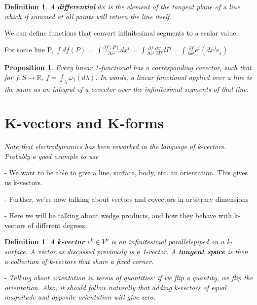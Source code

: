 \documentclass{book}
\newtheorem{defn}[equation]{Definition}
\newtheorem{prop}[equation]{Proposition}
\begin{document}
\begin{defn}
	A \textbf{differential} $dx$ is the element of the tangent plane of a line which if summed at all points will return the line itself. 
\end{defn}

We can define functions that convert infinitesimal segments to a scalar value. 

For some line P, $\int df(P)$ = $\int \frac{\partial f(P)}{{\partial x^i}} dx^i$ = $\int \frac{\partial f}{\partial x^i}\frac{\partial x^i}{\partial P}dP$ = $\int \frac{{\partial f}}{{\partial x^i}} e^i (dx^j e_j)$






\begin{prop}
	Every linear 1-functional has a corresponding covector, such that for $f : S \to \mathbb{R}$, $f = \int_{\lambda} \omega_1(d\lambda)$. In words, a linear functional applied over a line is the same as an integral of a covector over the infinitesimal segments of that line. 
\end{prop}





\section{K-vectors and K-forms}

\emph{Note that electrodynamics has been reworked in the language of k-vectors. Probably a good example to use}





- We want to be able to give a line, surface, body, etc. an orientation. This gives us k-vectors.

- Further, we're now talking about vectors and covectors in arbitrary dimensions

- Here we will be talking about wedge products, and how they behave with k-vectors of different degrees. 



\begin{defn}
	A \textbf{k-vector} $v^k \in V^k$ is an infinitesimal parallelepiped on a k-surface. A vector as discussed previously is a 1-vector. A \textbf{tangent space} is then a collection of k-vectors that share a fixed corner. 
\end{defn}

- \emph{Talking about orientation in terms of quantities: if we flip a quantity, we flip the orientation. Also, it should follow naturally that adding k-vectors of equal magnitude and opposite orientation will give zero.}
\end{document}
